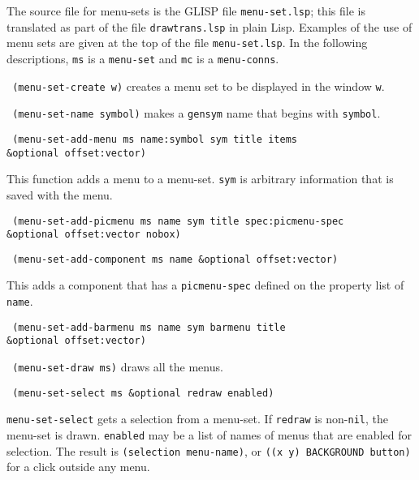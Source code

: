 The source file for menu-sets is the GLISP file {\tt menu-set.lsp};
this file is translated as part of the file {\tt drawtrans.lsp} in
plain Lisp.  Examples of the use of menu sets are given at the top
of the file {\tt menu-set.lsp}.  In the following descriptions,
{\tt ms} is a {\tt menu-set} and {\tt mc} is a {\tt menu-conns}.

{\tt \hspace*{0.5in} (menu-set-create w)} creates a menu set to be displayed
in the window {\tt w}.

{\tt \hspace*{0.5in} (menu-set-name symbol)} makes a {\tt gensym} name that
begins with {\tt symbol}.

{\tt \hspace*{0.5in} (menu-set-add-menu ms name:symbol sym title items} \\
\hspace*{1.5in} {\tt \&optional offset:vector)}

This function adds a menu to a menu-set.  {\tt sym} is arbitrary
information that is saved with the menu.

{\tt \hspace*{0.5in} (menu-set-add-picmenu ms name sym title spec:picmenu-spec} \\
\hspace*{1.5in} {\tt \&optional offset:vector nobox)}

{\tt \hspace*{0.5in} (menu-set-add-component ms name \&optional offset:vector)}

This adds a component that has a {\tt picmenu-spec} defined on the
property list of {\tt name}.

{\tt \hspace*{0.5in} (menu-set-add-barmenu ms name sym barmenu title} \\
\hspace*{1.5in} {\tt \&optional offset:vector)}

{\tt \hspace*{0.5in} (menu-set-draw ms)} draws all the menus.

{\tt \hspace*{0.5in} (menu-set-select ms \&optional redraw enabled)}

{\tt menu-set-select} gets a selection from a menu-set.  If {\tt redraw}
is non-{\tt nil}, the menu-set is drawn.  {\tt enabled} may be a list
of names of menus that are enabled for selection.  The result is
{\tt (selection menu-name)}, or {\tt ((x y) BACKGROUND button)}
for a click outside any menu.


